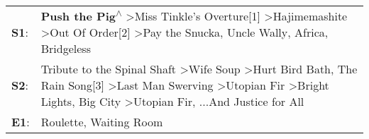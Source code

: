 \begin{supertabular}{p{0.03\textwidth}p{0.92\textwidth}}
 \textbf{S1}:  &                                                                                  \textbf{Push the Pig\textsuperscript{$\wedge$}} \textgreater \enspace Miss Tinkle's Overture[1]\textsuperscript{} \textgreater \enspace Hajimemashite\textsuperscript{} \textgreater \enspace Out Of Order[2]\textsuperscript{} \textgreater \enspace Pay the Snucka\textsuperscript{}, \enspace Uncle Wally\textsuperscript{}, \enspace Africa\textsuperscript{}, \enspace Bridgeless\textsuperscript{}  \enspace  \\
 \textbf{S2}:  &  Tribute to the Spinal Shaft\textsuperscript{} \textgreater \enspace Wife Soup\textsuperscript{} \textgreater \enspace Hurt Bird Bath\textsuperscript{}, \enspace The Rain Song[3]\textsuperscript{} \textgreater \enspace Last Man Swerving\textsuperscript{} \textgreater \enspace Utopian Fir\textsuperscript{} \textgreater \enspace Bright Lights, Big City\textsuperscript{} \textgreater \enspace Utopian Fir\textsuperscript{}, \enspace ...And Justice for All\textsuperscript{}  \enspace  \\
 \textbf{E1}:  &                                                                                                                                                                                                                                                                                                                                                                                                                       Roulette\textsuperscript{}, \enspace Waiting Room\textsuperscript{}  \enspace  \\
\end{supertabular}
